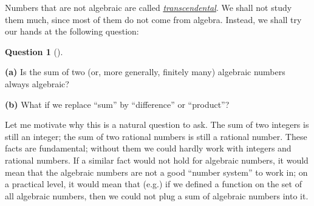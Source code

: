 \documentclass[numbers=enddot,12pt,final,onecolumn,notitlepage]{scrartcl}%
\numberwithin{exer}{section}
\theoremstyle{definition}
\newtheorem{quest}[theo]{Question}
\newenvironment{question}[1][]
{\begin{quest}[#1]\begin{leftbar}}
{\end{leftbar}\end{quest}}
\newenvironment{question}[1][Question]{\noindent\textbf{#1.} }{\ \rule{0.5em}{0.5em}}
\begin{document}
Numbers that are not algebraic are called
\href{https://en.wikipedia.org/wiki/Transcendental_number}{\textit{transcendental}}.
We shall not study them much, since most of them do not come from algebra.
Instead, we shall try our hands at the following question:

\begin{question} \label{quest.intro.algnum.1}
\textbf{(a)}
Is the sum of two (or, more generally, finitely many) algebraic
numbers always algebraic?

\textbf{(b)} What if we replace ``sum'' by ``difference'' or ``product''?
\end{question}

Let me motivate why this is a natural question to ask.
The sum of two integers is still an integer; the sum of two rational
numbers is still a rational number.
These facts are fundamental; without them we could hardly work with integers
and rational numbers.
If a similar fact would not hold for algebraic numbers, it would mean that
the algebraic numbers are not a good ``number system'' to work in; on a
practical level, it would mean that (e.g.) if we defined a function on the
set of all algebraic numbers, then we could not plug a sum of algebraic
numbers into it.
\end{document}
